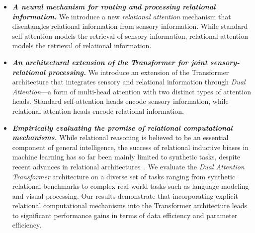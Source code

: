 \begin{itemize}[left=5pt]
  \item \textit{\textbf{A neural mechanism for routing and processing relational information.}} We introduce a new \textit{relational attention} mechanism that disentangles relational information from sensory information. While standard self-attention models the retrieval of sensory information, relational attention models the retrieval of relational information.
  \item \textit{\textbf{An architectural extension of the Transformer for joint sensory-relational processing.}} We introduce an extension of the Transformer architecture that integrates sensory and relational information through \textit{Dual Attention}---a form of multi-head attention with two distinct types of attention heads. Standard self-attention heads encode sensory information, while relational attention heads encode relational information.
  \item \textit{\textbf{Empirically evaluating the promise of relational computational mechanisms.}} While relational reasoning is believed to be an essential component of general intelligence, the success of relational inductive biases in machine learning has so far been mainly limited to synthetic tasks, despite recent advances in relational architectures~\citep{santoroSimpleNeuralNetwork2017,santoroRelationalRecurrentNeural2018,shanahanExplicitlyRelationalNeurala,webbEmergentSymbolsBinding2021,webbRelationalBottleneckInductive2024,kergNeuralArchitectureInductive2022,altabaa2024abstractors,altabaaLearningHierarchicalRelational2024}. We evaluate the \textit{Dual Attention Transformer} architecture on a diverse set of tasks ranging from synthetic relational benchmarks to complex real-world tasks such as language modeling and visual processing. Our results demonstrate that incorporating explicit relational computational mechanisms into the Transformer architecture leads to significant performance gains in terms of data efficiency and parameter efficiency.
\end{itemize}

